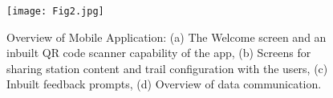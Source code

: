 \begin{figure}
\begin{center}
\texttt{[image: Fig2.jpg]}
\caption{Overview of Mobile Application: (a) The Welcome screen and an inbuilt QR code scanner capability of the app, (b) Screens for sharing station content and trail configuration with the users, (c) Inbuilt feedback prompts, (d) Overview of data communication.}
\label{fig:mobileapp}
\end{center}
\end{figure}

